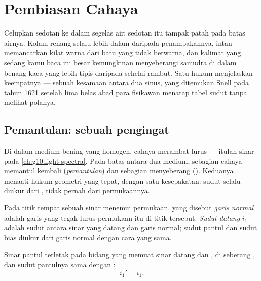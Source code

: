 \chapter{Pembiasan Cahaya}\label{ch:g10:refraction}

Celupkan sedotan ke dalam segelas air: sedotan itu tampak patah pada
batas airnya. Kolam renang selalu lebih dalam daripada penampakannya,
intan memancarkan kilat warna dari batu yang tidak berwarna, dan
kalimat yang sedang kamu baca ini besar kemungkinan menyeberangi
samudra di dalam benang kaca yang lebih tipis daripada sehelai rambut.
Satu hukum menjelaskan keempatnya --- sebuah kesamaan antara dua sinus,
yang ditemukan Snell pada tahun 1621 setelah lima belas abad para
fisikawan menatap tabel sudut tanpa melihat polanya.

\section{Pemantulan: sebuah pengingat}

Di dalam medium bening yang homogen, cahaya merambat lurus --- itulah
sinar pada \cref{ch:g10:light-spectra}. Pada batas antara dua medium,
sebagian cahaya memantul kembali (\emph{pemantulan}) dan sebagian
menyeberang (\emph{}). Keduanya menaati hukum geometri yang
tepat, dengan satu kesepakatan: sudut selalu diukur dari \emph{}, tidak pernah dari permukaannya.

\begin{definition}\label{def:g10:refraction:angles}
Pada titik tempat sebuah sinar menemui permukaan, yang disebut
\emph{garis normal} adalah garis yang tegak lurus
permukaan itu di titik tersebut. \emph{Sudut datang}
$i_1$ adalah sudut antara sinar yang datang dan garis normal; sudut
pantul dan sudut bias diukur dari garis normal dengan cara yang sama.
\end{definition}

\begin{proposition}\label{prop:g10:refraction:reflection}
Sinar pantul terletak pada bidang yang memuat sinar datang dan , di seberang , dan sudut pantulnya sama dengan :
\[
i_1' = i_1 .
\]
\end{proposition}
\admitted

